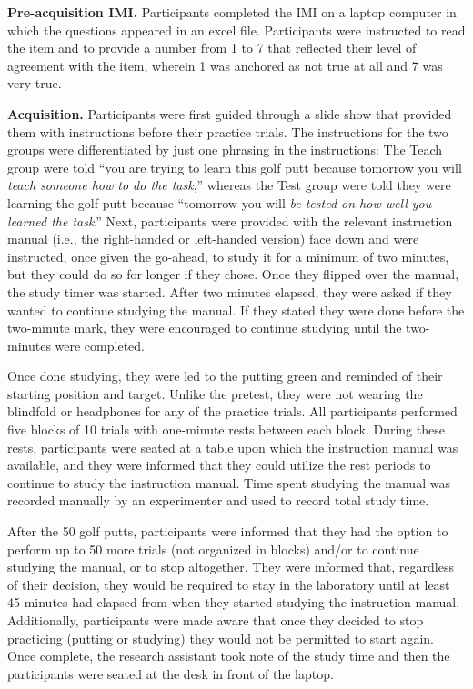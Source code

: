 \documentclass[
  english,
  man,floatsintext]{apa7}
\begin{document}
\textbf{Pre-acquisition IMI.} Participants completed the IMI on a laptop computer in which the questions appeared in an excel file. Participants were instructed to read the item and to provide a number from 1 to 7 that reflected their level of agreement with the item, wherein 1 was anchored as not true at all and 7 was very true.

\textbf{Acquisition.} Participants were first guided through a slide show that provided them with instructions before their practice trials. The instructions for the two groups were differentiated by just one phrasing in the instructions: The Teach group were told ``you are trying to learn this golf putt because tomorrow you will \emph{teach someone how to do the task},'' whereas the Test group were told they were learning the golf putt because ``tomorrow you will \emph{be tested on how well you learned the task}.'' Next, participants were provided with the relevant instruction manual (i.e., the right-handed or left-handed version) face down and were instructed, once given the go-ahead, to study it for a minimum of two minutes, but they could do so for longer if they chose. Once they flipped over the manual, the study timer was started. After two minutes elapsed, they were asked if they wanted to continue studying the manual. If they stated they were done before the two-minute mark, they were encouraged to continue studying until the two-minutes were completed.

Once done studying, they were led to the putting green and reminded of their starting position and target. Unlike the pretest, they were not wearing the blindfold or headphones for any of the practice trials. All participants performed five blocks of 10 trials with one-minute rests between each block. During these rests, participants were seated at a table upon which the instruction manual was available, and they were informed that they could utilize the rest periods to continue to study the instruction manual. Time spent studying the manual was recorded manually by an experimenter and used to record total study time.

After the 50 golf putts, participants were informed that they had the option to perform up to 50 more trials (not organized in blocks) and/or to continue studying the manual, or to stop altogether. They were informed that, regardless of their decision, they would be required to stay in the laboratory until at least 45 minutes had elapsed from when they started studying the instruction manual. Additionally, participants were made aware that once they decided to stop practicing (putting or studying) they would not be permitted to start again. Once complete, the research assistant took note of the study time and then the participants were seated at the desk in front of the laptop.
\end{document}
